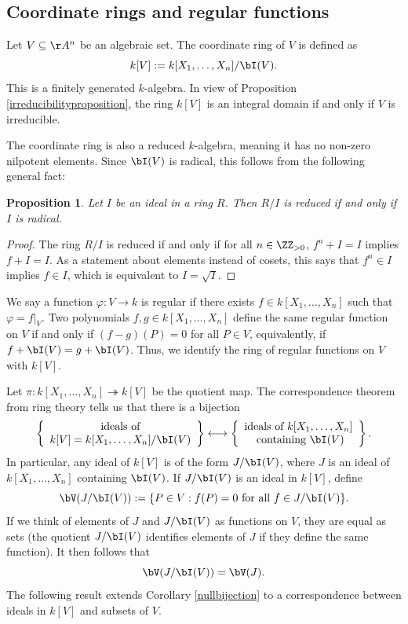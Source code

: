\documentclass[12pt]{amsart}
\theoremstyle{plain}
\newtheorem{proposition}[theorem]{Proposition}
\theoremstyle{definition}
\begin{document}
\subsection{Coordinate rings and regular functions}
Let $V \subseteq \AA^n$ be an algebraic set.
The coordinate ring of $V$ is defined as
$$k[V] := k[X_1, \ldots, X_n] / \bI(V).$$
This is a finitely generated $k$-algebra.
In view of Proposition \ref{irreducibilityproposition}, the ring $k[V]$ is an integral domain if and only if $V$ is irreducible.

The coordinate ring is also a reduced $k$-algebra, meaning it has no non-zero nilpotent elements.
Since $\bI(V)$ is radical, this follows from the following general fact:

\begin{proposition}\label{reducedradical}
Let $I$ be an ideal in a ring $R$.
Then $R/I$ is reduced if and only if $I$ is radical.
\end{proposition}
\begin{proof}
The ring $R/I$ is reduced if and only if for all $n \in \ZZ_{> 0}$, $f^n + I = I$ implies $f + I = I$.
As a statement about elements instead of cosets, this says that $f^n \in I$ implies $ f \in I$, which is equivalent to $I = \sqrt{I}$.
\end{proof}

We say a function $\varphi \colon V \to k$ is regular if there exists $f \in k[X_1, \ldots, X_n]$ such that $\varphi = \left. f \right|_V$.
Two polynomials $f, g \in k[X_1, \ldots, X_n]$ define the same regular function on $V$ if and only if $(f- g)(P) = 0$ for all $P \in V$,
equivalently, if $f + \bI(V) = g + \bI(V)$.
Thus, we identify the ring of regular functions on $V$ with $k[V]$.

Let $\pi : k[X_1, \ldots, X_n] \twoheadrightarrow k[V]$ be the quotient map.
The correspondence theorem from ring theory tells us that there is a bijection
\begin{align}\label{ringidealbijection}
\left\{
\begin{array}{c}
	\text{ideals of} \\
	k[V]=k[X_1,\ldots,X_n]/\bI(V)
\end{array}
\right\} \longleftrightarrow 
\left\{
\begin{array}{c}
	\text{ideals of } k[X_1, \ldots, X_n] \\
	\text{ containing } \bI(V)
\end{array}
\right\}.
\end{align}
In particular, any ideal of $k[V]$ is of the form $J/\bI(V)$, where $J$ is an ideal of $k[X_1, \ldots, X_n]$ containing $\bI(V)$.
If $J / \bI(V)$ is an ideal in $k[V]$, define
$$\bV(J/\bI(V)) := \{P \in V : f(P) = 0 \text{ for all } f \in J/\bI(V)\}.$$
If we think of elements of $J$ and $J/\bI(V)$ as functions on $V$, they are equal as sets (the quotient $J/\bI(V)$ identifies elements of $J$ if they define the same function).
It then follows that
$$\bV(J/\bI(V)) = \bV(J).$$
The following result extends Corollary \ref{nullbijection} to a correspondence between ideals in $k[V]$ and subsets of $V$.
\end{document}
